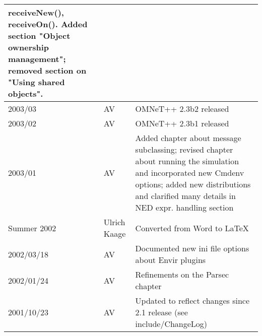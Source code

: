 \begin{longtable}{|l|p{1cm}|p{10cm}|}
               receiveNew(), receiveOn().
               Added section "Object ownership management"; removed section
               on "Using shared objects". \\\hline
2003/03 & AV & OMNeT++ 2.3b2 released\\\hline
2003/02 & AV & OMNeT++ 2.3b1 released\\\hline
2003/01 & AV & Added chapter about message subclassing; revised chapter about
               running the simulation and incorporated new Cmdenv options; added new
               distributions and clarified many details in NED expr. handling section\\\hline
Summer 2002 & Ulrich Kaage & Converted from Word to LaTeX\\\hline
2002/03/18 & AV & Documented new ini file options about Envir plugins\\\hline
2002/01/24 & AV & Refinements on the Parsec chapter\\\hline
2001/10/23 & AV & Updated to reflect changes since 2.1 release (see include/ChangeLog)\\\hline
\end{longtable}




